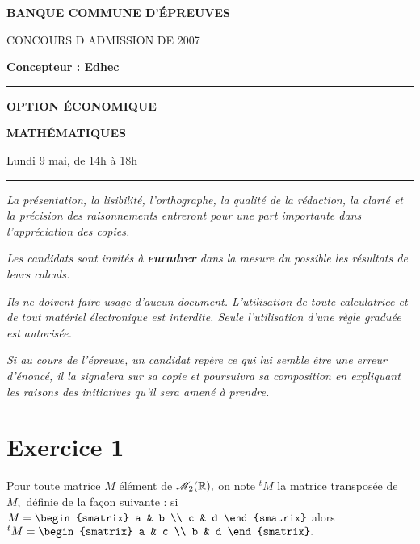 \documentclass[11pt]{article}%
\begin{document}

\begin{center}
{\LARG\E\textbf{BANQUE COMMUNE D'ÉPREUVES}}



{\large \textsc{CONCOURS D ADMISSION DE 2007}}



{\large \textbf{Concepteur : Edhec}}



\rule{2.39cm}{0.05cm}



{\Large \textbf{OPTION ÉCONOMIQUE}}



{\Large \textbf{MATHÉMATIQUES }}



{\Large Lundi 9 mai, de 14h à 18h}



\rule{2.39cm}{0.05cm}
\end{center}

\textit{La présentation, la lisibilité, l'orthographe, la qualité
de la rédaction, la clarté et la précision des raisonnements
entreront pour une part importante dans l'appréciation des copies.}

\textit{Les candidats sont invités à \textbf{encadrer} dans la mesure
du possible les résultats de leurs calculs.}

\textit{Ils ne doivent faire usage d'aucun document. L'utilisation de
toute
calculatrice et de tout matériel électronique est interdite. Seule
l'utilisation d'une règle graduée est autorisée.}

\textit{Si au cours de l'épreuve, un candidat repère ce qui lui semble
être une erreur d'énoncé, il la signalera sur sa copie et
poursuivra sa composition en expliquant les raisons des initiatives
qu'il sera
amené à prendre.}

\vspace*{3cm}

\section*{Exercice 1}

Pour toute matrice $M$ élément de $\mathscr{M}_{2}(\mathbb{R}),$ on note $^{t}M$ la matrice
transposée de $M,$ définie de
la façon suivante : si $M = 
\begin{smatrix}
a & b \\
c & d
\end{smatrix}
$ alors $^{t}M = 
\begin{smatrix}
a & c \\
b & d
\end{smatrix}.$
\end{document}
